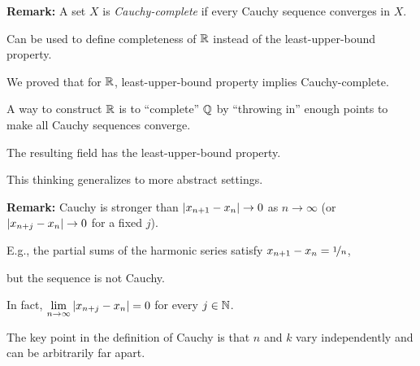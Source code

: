\documentclass[10pt,aspectratio=169]{beamer}
\begin{document}
\begin{frame}

\textbf{Remark:}
A set $X$ is
\emph{Cauchy-complete}
if every Cauchy sequence converges in $X$.

\pause
Can be used to define completeness of ${\mathbb{R}}$ instead of
the least-upper-bound property.

\pause
We proved that for ${\mathbb{R}}$,
least-upper-bound property implies
Cauchy-complete.

\pause
A way to construct ${\mathbb{R}}$ is to
``complete'' ${\mathbb{Q}}$ by ``throwing in'' enough points to make all
Cauchy sequences converge.

\pause
The resulting field has the
least-upper-bound property.

\pause
This thinking generalizes to more abstract settings.

\pause
\medskip

\textbf{Remark:}
Cauchy is stronger than 
$\left\lvert {x_{n+1}-x_n} \right\rvert \to 0$
as $n \to \infty$
%
\pause
(or $\left\lvert {x_{n+j}-x_n} \right\rvert \to 0$ for a fixed $j$).

\pause
E.g., the partial sums of the harmonic series satisfy
$x_{n+1}-x_n = \nicefrac{1}{n}$,

but the sequence is not Cauchy.

\pause
In fact,
$\lim\limits_{n\to\infty} \left\lvert {x_{n+j}-x_n} \right\rvert = 0$ for
every $j \in {\mathbb{N}}$.

\pause
The key point in the definition of Cauchy is that $n$ and $k$
vary independently and can be arbitrarily far apart.

\end{frame}
\end{document}
